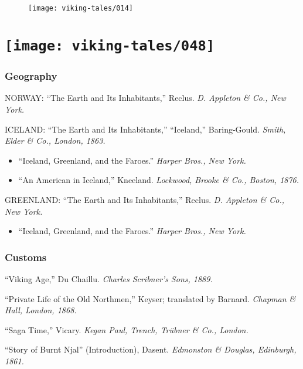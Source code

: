 \begin{figure}[hb]
    \centering
    \vskip8pt
    \texttt{[image: viking-tales/014]}
\end{figure}

\chapter[\itshape A Reading List]{
    \texttt{[image: viking-tales/048]}}

\subsection*{Geography}

NORWAY: ``The Earth and Its Inhabitants,'' Reclus. \emph{D. Appleton \&
Co., New York.}

\noindent ICELAND: ``The Earth and Its Inhabitants,'' ``Iceland,''
Baring-Gould. \emph{Smith, Elder \& Co., London, 1863.}

\begin{itemize}[itemsep=0pt]
\item ``Iceland, Greenland, and the Faroes.'' \emph{Harper Bros., New York.}
\item ``An American in Iceland,'' Kneeland. \emph{Lockwood, Brooke \& Co., Boston,
1876.}
\end{itemize}

\noindent GREENLAND: ``The Earth and Its Inhabitants,'' Reclus. \emph{D.
Appleton \& Co., New York.}

\begin{itemize}
\item ``Iceland, Greenland, and the Faroes.'' \emph{Harper Bros., New York.}
\end{itemize}

\subsection*{Customs}

``Viking Age,'' Du Chaillu. \emph{Charles Scribner's Sons, 1889.}

\noindent``Private Life of the Old Northmen,'' Keyser; translated by
Barnard. \emph{Chapman \& Hall, London, 1868.}

\noindent ``Saga Time,'' Vicary. \emph{Kegan Paul, Trench, Trübner \&
Co., London.}

\noindent ``Story of Burnt Njal'' (Introduction), Dasent. \emph{Edmonston
\& Douglas, Edinburgh, 1861.}


